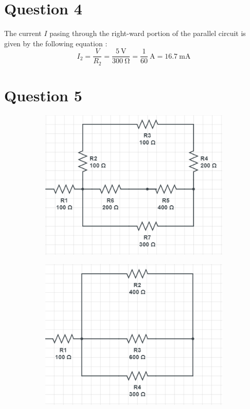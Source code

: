 \documentclass[
	12pt,
	]{article}
\theoremstyle{definition}
\theoremstyle{definition}
\theoremstyle{definition}
\theoremstyle{definition}
\theoremstyle{definition}
\theoremstyle{example}
\theoremstyle{note}
\theoremstyle{remark}
\theoremstyle{example}
\begin{document}
		 \section{Question 4}
		 	The current $I$ pasing through the right-ward portion of the parallel circuit is given by the following equation : 
		 	$$ I_{2} = \frac{V}{R_{2}} = \frac{5 \ \si{\volt}}{300 \ \si{\ohm}} = \frac{1}{60} \ \si{\ampere} = 16.7 \ \si{\milli\ampere}$$
		 \section{Question 5}
		 \begin{figure}[htp]
		 	\centering
		 	\begin{subfigure}[h]{0.3\textwidth}
		 		\includegraphics[width=\textwidth]{phys241_ass1_f1.png}
		 		\caption{}
		 	\end{subfigure}
		 	\hfill
		 	\begin{subfigure}[h]{0.3\textwidth}
		 		\includegraphics[width=\textwidth]{phys241_ass1_f2.png}

\end{subfigure}
\end{figure}
\end{document}
